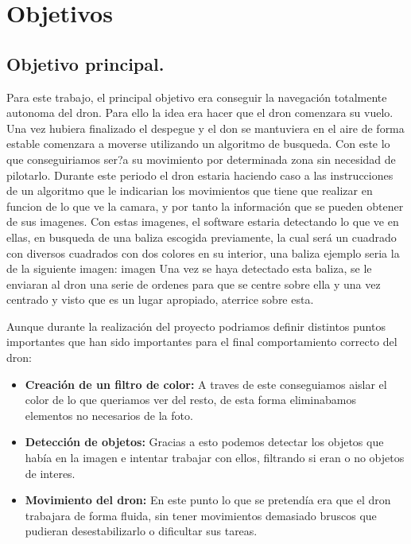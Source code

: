 \chapter{Objetivos}\label{cap.Objetivos}

\section{Objetivo principal.}
\hspace{1 cm} Para este trabajo, el principal objetivo era conseguir la navegaci\'on totalmente autonoma del dron. Para ello la idea era hacer que el dron comenzara su vuelo. Una vez hubiera finalizado el despegue y el don se mantuviera en el aire de forma estable comenzara a moverse utilizando un algoritmo de busqueda. Con este lo que conseguiriamos ser?a su movimiento por determinada zona sin necesidad de pilotarlo. Durante este periodo el dron estaria haciendo caso a las instrucciones de un algoritmo que le indicarian los movimientos que tiene que realizar en funcion de lo que ve la camara, y por tanto la informaci\'on que se pueden obtener de sus imagenes. Con estas imagenes, el software estaria detectando lo que ve en ellas, en busqueda de una baliza escogida previamente, la cual ser\'a un cuadrado con diversos cuadrados con dos colores en su interior, una baliza ejemplo seria la de la siguiente imagen: 
\newline
imagen
\newline
Una vez se haya detectado esta baliza, se le enviaran al dron una serie de ordenes para que se centre sobre ella y una vez centrado y visto que es un lugar apropiado, aterrice sobre esta. 

\hspace{1 cm} Aunque durante la realizaci\'on del proyecto podriamos definir distintos puntos importantes que han sido importantes para el final comportamiento correcto del dron:
\begin{itemize}
	\item \textbf{Creaci\'on de un filtro de color:} A traves de este conseguiamos aislar el color de lo que queriamos ver del resto, de esta forma eliminabamos elementos no necesarios de la foto.
	\item \textbf{Detecci\'on de objetos: } Gracias a esto podemos detectar los objetos que hab\'ia en la imagen e intentar trabajar con ellos, filtrando si eran o no objetos de interes.
	\item \textbf{Movimiento del dron: } En este punto lo que se pretend\'ia era que el dron trabajara de forma fluida, sin tener movimientos demasiado bruscos que pudieran desestabilizarlo o dificultar sus tareas. 
\end{itemize}


